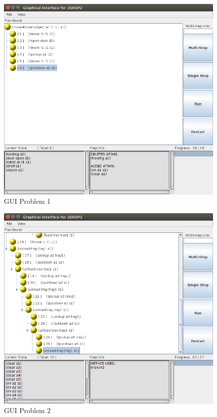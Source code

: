 \documentclass[paper=a4, fontsize=11pt]{scrartcl}
\begin{document}
	\begin{figure}
		\centering
		\includegraphics[width=1\linewidth]{images/problem1_gui}
		\caption{GUI Problem 1 }
		\label{fig:probem1_gui}
	\end{figure}
		
	\begin{figure}
	\centering
	\includegraphics[width=1\linewidth]{images/problem2_gui}
	\caption{GUI Problem 2}
	\label{fig:problem2_gui}
	\end{figure}
	
\end{document}
